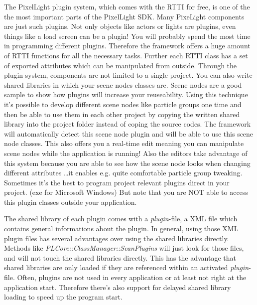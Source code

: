 The PixelLight plugin system, which comes with the RTTI for free, is one of the the most important parts of the PixelLight SDK. Many PixeLight components are just such plugins. Not only objects like actors or lights are plugins, even things like a load screen can be a plugin! You will probably spend the most time in programming different plugins. Therefore the framework offers a huge amount of RTTI functions for all the necessary tasks. Further each RTTI class has a set of exported attributes which can be manipulated from outside. Through the plugin system, components are not limited to a single project. You can also write shared libraries in which your scene nodes classes are. Scene nodes are a good sample to show how plugins will increase your reuseability. Using this technique it's possible to develop different scene nodes like particle groups one time and then be able to use them in each other project by copying the written shared library into the project folder instead of coping the source codes. The framework will automatically detect this scene node plugin and will be able to use this scene node classes. This also offers you a real-time edit meaning you can manipulate scene nodes while the application is running! Also the editors take advantage of this system because you are able to see how the scene node looks when changing different attributes \ldots it enables e.g. quite comfortable particle group tweaking. Sometimes it's the best to program project relevant plugins direct in your project. (exe for Microsoft Windows) But note that you are NOT able to access this plugin classes outside your application.

The shared library of each plugin comes with a \emph{plugin}-file, a XML file which contains general informations about the plugin. In general, using those XML plugin files has several advantages over using the shared libraries directly. Methods like \emph{PLCore::ClassManager::ScanPlugins} will just look for those files, and will not touch the shared libraries directly. This has the advantage that shared libraries are only loaded if they are referenced within an activated \emph{plugin}-file. Often, plugins are not used in every application or at least not right at the application start. Therefore there's also support for delayed shared library loading to speed up the program start.


